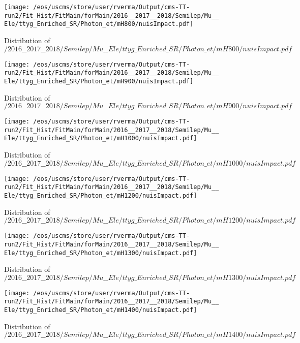 \begin{figure}
\centering
\texttt{[image: /eos/uscms/store/user/rverma/Output/cms-TT-run2/Fit\_Hist/FitMain/forMain/2016\_\_2017\_\_2018/Semilep/Mu\_\_Ele/ttyg\_Enriched\_SR/Photon\_et/mH800/nuisImpact.pdf]}
\caption{Distribution of $/2016\_\_2017\_\_2018/Semilep/Mu\_\_Ele/ttyg\_Enriched\_SR/Photon\_et/mH800/nuisImpact.pdf$}
\end{figure}

\begin{figure}
\centering
\texttt{[image: /eos/uscms/store/user/rverma/Output/cms-TT-run2/Fit\_Hist/FitMain/forMain/2016\_\_2017\_\_2018/Semilep/Mu\_\_Ele/ttyg\_Enriched\_SR/Photon\_et/mH900/nuisImpact.pdf]}
\caption{Distribution of $/2016\_\_2017\_\_2018/Semilep/Mu\_\_Ele/ttyg\_Enriched\_SR/Photon\_et/mH900/nuisImpact.pdf$}
\end{figure}

\begin{figure}
\centering
\texttt{[image: /eos/uscms/store/user/rverma/Output/cms-TT-run2/Fit\_Hist/FitMain/forMain/2016\_\_2017\_\_2018/Semilep/Mu\_\_Ele/ttyg\_Enriched\_SR/Photon\_et/mH1000/nuisImpact.pdf]}
\caption{Distribution of $/2016\_\_2017\_\_2018/Semilep/Mu\_\_Ele/ttyg\_Enriched\_SR/Photon\_et/mH1000/nuisImpact.pdf$}
\end{figure}

\begin{figure}
\centering
\texttt{[image: /eos/uscms/store/user/rverma/Output/cms-TT-run2/Fit\_Hist/FitMain/forMain/2016\_\_2017\_\_2018/Semilep/Mu\_\_Ele/ttyg\_Enriched\_SR/Photon\_et/mH1200/nuisImpact.pdf]}
\caption{Distribution of $/2016\_\_2017\_\_2018/Semilep/Mu\_\_Ele/ttyg\_Enriched\_SR/Photon\_et/mH1200/nuisImpact.pdf$}
\end{figure}

\begin{figure}
\centering
\texttt{[image: /eos/uscms/store/user/rverma/Output/cms-TT-run2/Fit\_Hist/FitMain/forMain/2016\_\_2017\_\_2018/Semilep/Mu\_\_Ele/ttyg\_Enriched\_SR/Photon\_et/mH1300/nuisImpact.pdf]}
\caption{Distribution of $/2016\_\_2017\_\_2018/Semilep/Mu\_\_Ele/ttyg\_Enriched\_SR/Photon\_et/mH1300/nuisImpact.pdf$}
\end{figure}

\begin{figure}
\centering
\texttt{[image: /eos/uscms/store/user/rverma/Output/cms-TT-run2/Fit\_Hist/FitMain/forMain/2016\_\_2017\_\_2018/Semilep/Mu\_\_Ele/ttyg\_Enriched\_SR/Photon\_et/mH1400/nuisImpact.pdf]}
\caption{Distribution of $/2016\_\_2017\_\_2018/Semilep/Mu\_\_Ele/ttyg\_Enriched\_SR/Photon\_et/mH1400/nuisImpact.pdf$}
\end{figure}

